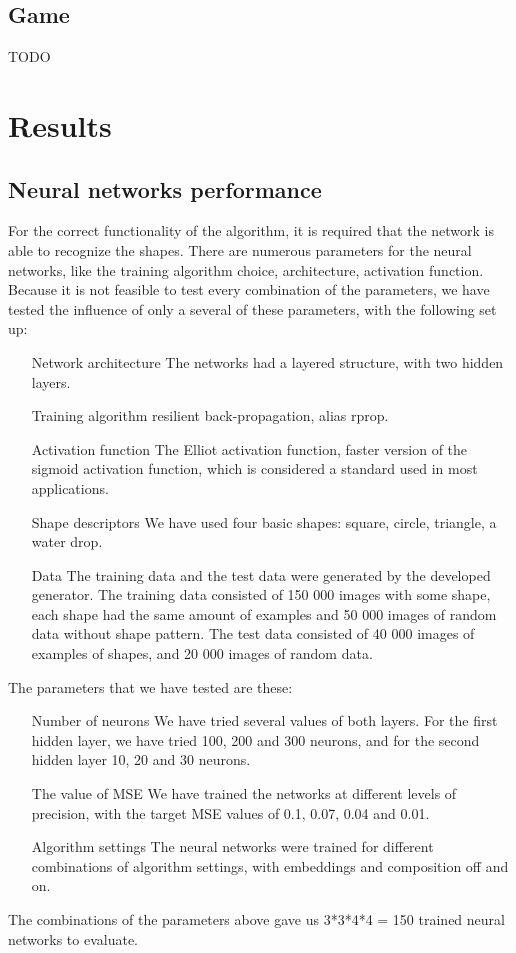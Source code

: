 \section{Game}
TODO

\chapter{Results}

\section{Neural networks performance}
For the correct functionality of the algorithm, it is required that the network is able to recognize the shapes. There are numerous parameters for the neural networks, like the training algorithm choice, architecture, activation function. Because it is not feasible to test every combination of the parameters, we have tested the influence of only a several of these parameters, with the following set up:
\begin{enumerate}
\item [Network architecture] The networks had a layered structure, with two hidden layers.
\item [Training algorithm] resilient back-propagation, alias rprop.
\item [Activation function] The Elliot activation function, faster version of the sigmoid activation function, which is considered a standard used in most applications.
\item [Shape descriptors] We have used four basic shapes: square, circle, triangle, a water drop. 
\item [Data] The training data and the test data were generated by the developed generator. The training data consisted of 150 000 images with some shape, each shape had the same amount of examples and 50 000 images of random data without shape pattern. The test data consisted of 40 000 images of examples of shapes, and 20 000 images of random data.
\end{enumerate}

The parameters that we have tested are these:
\begin{enumerate}
\item [Number of neurons] We have tried several values of both layers. For the first hidden layer, we have tried 100, 200 and 300 neurons, and for the second hidden layer 10, 20 and 30 neurons. 
\item [The value of MSE] We have trained the networks at different levels of precision, with the target MSE values of 0.1, 0.07, 0.04 and 0.01.   
\item [Algorithm settings] The neural networks were trained for different combinations of algorithm settings, with embeddings and composition off and on.
\end{enumerate}
The combinations of the parameters above gave us 3*3*4*4 = 150 trained neural networks to evaluate.

